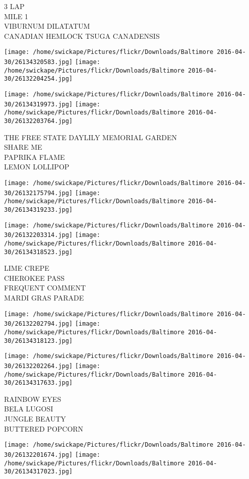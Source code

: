 \documentclass[10pt,letterpaper]{article}
\begin{document}
3 LAP\\
MILE 1\\
VIBURNUM DILATATUM\\
CANADIAN HEMLOCK TSUGA CANADENSIS
\pagebreak

\texttt{[image: /home/swickape/Pictures/flickr/Downloads/Baltimore 2016-04-30/26134320583.jpg]}
\texttt{[image: /home/swickape/Pictures/flickr/Downloads/Baltimore 2016-04-30/26132204254.jpg]}

\texttt{[image: /home/swickape/Pictures/flickr/Downloads/Baltimore 2016-04-30/26134319973.jpg]}
\texttt{[image: /home/swickape/Pictures/flickr/Downloads/Baltimore 2016-04-30/26132203764.jpg]}

THE FREE STATE DAYLILY MEMORIAL GARDEN\\
SHARE ME\\
PAPRIKA FLAME\\
LEMON LOLLIPOP
\pagebreak

\texttt{[image: /home/swickape/Pictures/flickr/Downloads/Baltimore 2016-04-30/26132175794.jpg]}
\texttt{[image: /home/swickape/Pictures/flickr/Downloads/Baltimore 2016-04-30/26134319233.jpg]}

\texttt{[image: /home/swickape/Pictures/flickr/Downloads/Baltimore 2016-04-30/26132203314.jpg]}
\texttt{[image: /home/swickape/Pictures/flickr/Downloads/Baltimore 2016-04-30/26134318523.jpg]}

LIME CREPE\\
CHEROKEE PASS\\
FREQUENT COMMENT\\
MARDI GRAS PARADE
\pagebreak

\texttt{[image: /home/swickape/Pictures/flickr/Downloads/Baltimore 2016-04-30/26132202794.jpg]}
\texttt{[image: /home/swickape/Pictures/flickr/Downloads/Baltimore 2016-04-30/26134318123.jpg]}

\texttt{[image: /home/swickape/Pictures/flickr/Downloads/Baltimore 2016-04-30/26132202264.jpg]}
\texttt{[image: /home/swickape/Pictures/flickr/Downloads/Baltimore 2016-04-30/26134317633.jpg]}

RAINBOW EYES\\
BELA LUGOSI\\
JUNGLE BEAUTY\\
BUTTERED POPCORN
\pagebreak

\texttt{[image: /home/swickape/Pictures/flickr/Downloads/Baltimore 2016-04-30/26132201674.jpg]}
\texttt{[image: /home/swickape/Pictures/flickr/Downloads/Baltimore 2016-04-30/26134317023.jpg]}
\end{document}
